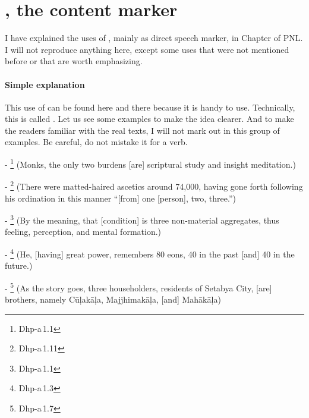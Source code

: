 {}
\section*{, the content marker}

I have explained the uses of , mainly as direct speech marker, in Chapter  of PNL. I will not reproduce anything here, except some uses that were not mentioned before or that are worth emphasizing. 

\paragraph*{Simple explanation} This use of  can be found here and there because it is handy to use. Technically, this is called . Let us see some examples to make the idea clearer. And to make the readers familiar with the real texts, I will not mark out  in this group of examples. Be careful, do not mistake it for a verb.\par
- \footnote{Dhp-a\,1.1} (Monks, the only two burdens [are] scriptural study and insight meditation.)\par
- \footnote{Dhp-a\,1.11} (There were matted-haired ascetics around 74,000, having gone forth following his ordination in this manner ``[from] one [person], two, three.'')\par
- \footnote{Dhp-a\,1.1} (By the meaning, that [condition] is three non-material aggregates, thus feeling, perception, and mental formation.)\par
- \footnote{Dhp-a\,1.3} (He, [having] great power, remembers 80 eons, 40 in the past [and] 40 in the future.)\par
- \footnote{Dhp-a\,1.7} (As the story goes, three householders, residents of Setabya City, [are] brothers, namely C\=u\d lak\=a\d la, Majjhimak\=a\d la, [and] Mah\=ak\=a\d la)\par

